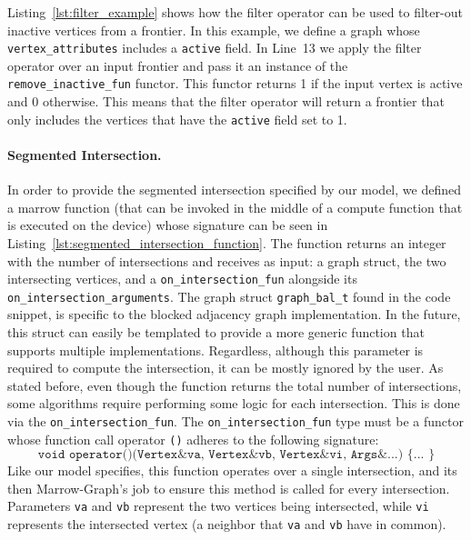 Listing~\ref{lst:filter_example} shows how the filter operator can be used to filter-out inactive vertices from a frontier. In this example, we define a graph whose \texttt{vertex\_attributes} includes a \texttt{active} field. In Line~13 we apply the filter operator over an input frontier and pass it an instance of the \texttt{remove\_inactive\_fun} functor. This functor returns 1 if the input vertex is active and 0 otherwise. This means that the filter operator will return a frontier that only includes the vertices that have the \texttt{active} field set to 1.


\paragraph{\textbf{Segmented Intersection}.}
%
In order to provide the segmented intersection specified by our model, we defined a marrow function (that can be invoked in the middle of a compute function that is executed on the device) whose signature can be seen in Listing~\ref{lst:segmented_intersection_function}. The function returns an integer with the number of intersections and receives as input: a graph struct, the two intersecting vertices, and a \texttt{on\_intersection\_fun} alongside its \texttt{on\_intersection\_arguments}. The graph struct \texttt{graph\_bal\_t} found in the code snippet, is specific to the blocked adjacency graph implementation. In the future, this struct can easily be templated to provide a more generic function that supports multiple implementations. Regardless, although this parameter is required to compute the intersection, it can be mostly ignored by the user. As stated before, even though the function returns the total number of intersections, some algorithms require performing some logic for each intersection. This is done via the \texttt{on\_intersection\_fun}. The \texttt{on\_intersection\_fun} type must be a functor whose function call operator \texttt{()} adheres to the following signature: \[\texttt{void operator()(Vertex\& va, Vertex\& vb, Vertex\& vi, Args\&...) \{ ... \}}\] Like our model specifies, this function operates over a single intersection, and its then Marrow-Graph's job to ensure this method is called for every intersection. Parameters \texttt{va} and \texttt{vb} represent the two vertices being intersected, while \texttt{vi} represents the intersected vertex (a neighbor that \texttt{va} and \texttt{vb} have in common).

